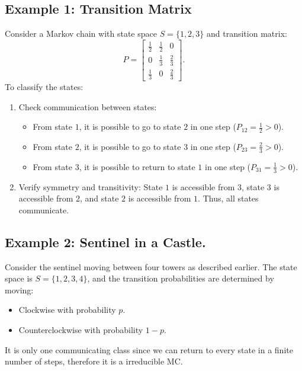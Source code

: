 \subsection{Example 1: Transition Matrix}
Consider a Markov chain with state space \( S = \{1, 2, 3\} \) and transition matrix:
\[
P =
\begin{bmatrix}
\frac{1}{2} & \frac{1}{2} & 0 \\
0 & \frac{1}{3} & \frac{2}{3} \\
\frac{1}{3} & 0 & \frac{2}{3}
\end{bmatrix}.
\]
To classify the states:
\begin{enumerate}
    \item Check communication between states:
        \begin{itemize}
           \item From state \( 1 \), it is possible to go to state \( 2 \) in one step (\( P_{12} = \frac{1}{2} > 0 \)).
           \item From state \( 2 \), it is possible to go to state \( 3 \) in one step (\( P_{23} = \frac{2}{3} > 0 \)).
           \item From state \( 3 \), it is possible to return to state \( 1 \) in one step (\( P_{31} = \frac{1}{3} > 0 \)).
   \end{itemize}
    \item Verify symmetry and transitivity: State \( 1 \) is accessible from \( 3 \), state \( 3 \) is accessible from \( 2 \), and state \( 2 \) is accessible from \( 1 \). Thus, all states communicate.
\end{enumerate}

\subsection{Example 2: Sentinel in a Castle.}

Consider the sentinel moving between four towers as described earlier. The state space is \( S = \{1, 2, 3, 4\} \), and the transition probabilities are determined by moving:
\begin{itemize}
    \item Clockwise with probability \( p \).
    \item Counterclockwise with probability \( 1-p \).
\end{itemize}
It is only one communicating class since we can return to every state in a finite number of steps, therefore it is a irreducible MC.

